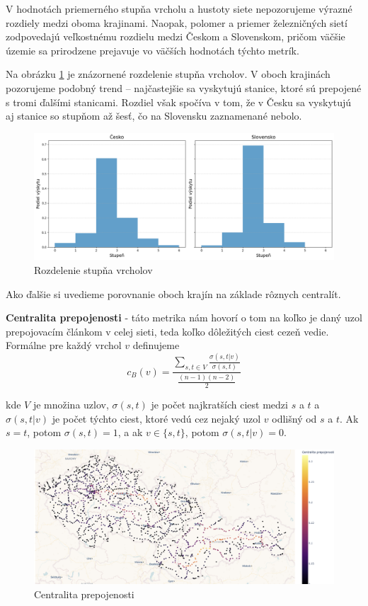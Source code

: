 \documentclass[main.tex]{subfiles}
\begin{document}
V hodnotách priemerného stupňa vrcholu a hustoty siete nepozorujeme výrazné rozdiely medzi oboma krajinami. Naopak, polomer a priemer železničných sietí zodpovedajú veľkostnému rozdielu medzi Českom a Slovenskom, pričom väčšie územie sa prirodzene prejavuje vo väčších hodnotách týchto metrík.

Na obrázku \ref{obr:degree_distrib} je znázornené rozdelenie stupňa vrcholov. V oboch krajinách pozorujeme podobný trend – najčastejšie sa vyskytujú stanice, ktoré sú prepojené s tromi ďalšími stanicami. Rozdiel však spočíva v tom, že v Česku sa vyskytujú aj stanice so stupňom až šesť, čo na Slovensku zaznamenané nebolo.

\begin{figure}
    \centerline{\includegraphics[width=1\textwidth]{images/degree_distrib.png}}
    \caption{Rozdelenie stupňa vrcholov}
    \label{obr:degree_distrib}
\end{figure}

Ako ďalšie si uvedieme porovnanie oboch krajín na základe rôznych centralít.

\textbf{Centralita prepojenosti} - táto metrika nám hovorí o tom na koľko je daný uzol prepojovacím článkom v celej sieti, teda koľko dôležitých ciest cezeň vedie. Formálne pre každý vrchol $v$ definujeme 
\begin{equation*}
    c_B(v) =\frac{\sum_{s,t \in V} \frac{\sigma(s, t|v)}{\sigma(s, t)}}{\frac{(n-1)(n-2)}{2}}
\end{equation*}

kde $V$ je množina uzlov, $\sigma(s, t)$ je počet najkratších ciest medzi $s$ a $t$ a $\sigma(s, t |v)$ je počet týchto ciest, ktoré vedú cez nejaký uzol $v$ odlišný od $s$ a $t$. Ak $s = t$, potom $\sigma(s, t) = 1$, a ak $v \in \{s, t \}$, potom $\sigma(s, t |v ) = 0$. 

\begin{figure}
    \centerline{\includegraphics[width=1\textwidth]{images/betweenes.png}}
    \caption{Centralita prepojenosti}
    \label{obr:betweenes}
\end{figure}
\end{document}

